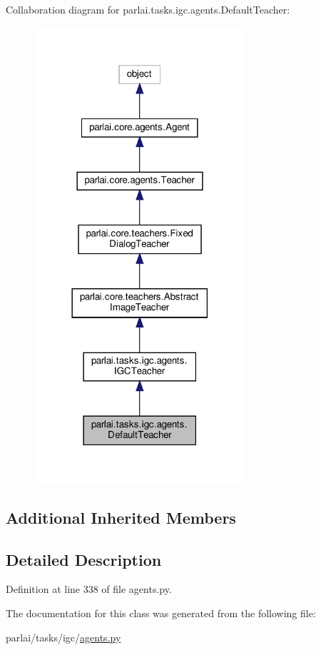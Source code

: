 Collaboration diagram for parlai.\+tasks.\+igc.\+agents.\+Default\+Teacher\+:
\nopagebreak
\begin{figure}[H]
\begin{center}
\leavevmode
\includegraphics[width=222pt]{d7/db0/classparlai_1_1tasks_1_1igc_1_1agents_1_1DefaultTeacher__coll__graph}
\end{center}
\end{figure}
\subsection*{Additional Inherited Members}


\subsection{Detailed Description}


Definition at line 338 of file agents.\+py.



The documentation for this class was generated from the following file\+:\begin{DoxyCompactItemize}
\item 
parlai/tasks/igc/\hyperlink{parlai_2tasks_2igc_2agents_8py}{agents.\+py}\end{DoxyCompactItemize}
